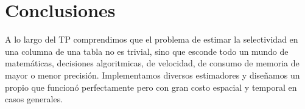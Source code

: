 \section{Conclusiones}
A lo largo del TP comprendimos que el problema de estimar la selectividad en una columna de una tabla no es trivial, sino que esconde todo un mundo de matemáticas, decisiones algoritmicas, de velocidad, de consumo de memoria de mayor o menor precisión. Implementamos diversos estimadores y diseñamos un propio que funcionó perfectamente pero con gran costo espacial y temporal en casos generales.
